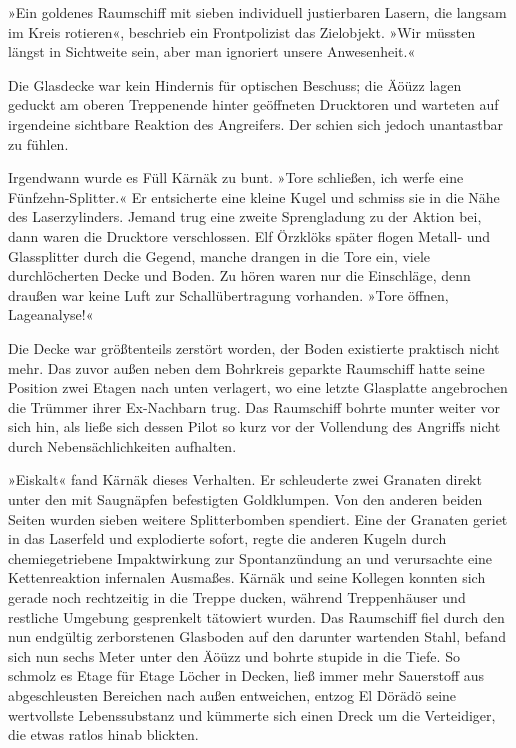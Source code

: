 »Ein goldenes Raumschiff mit sieben individuell justierbaren Lasern, die langsam im Kreis rotieren«, beschrieb ein Frontpolizist das Zielobjekt. »Wir müssten längst in Sichtweite sein, aber man ignoriert unsere Anwesenheit.«

Die Glasdecke war kein Hindernis für optischen Beschuss; die Äöüzz lagen geduckt am oberen Treppenende hinter geöffneten Drucktoren und warteten auf irgendeine sichtbare Reaktion des Angreifers. Der schien sich jedoch unantastbar zu fühlen.

Irgendwann wurde es Füll Kärnäk zu bunt. »Tore schließen, ich werfe eine Fünfzehn-Splitter.« Er entsicherte eine kleine Kugel und schmiss sie in die Nähe des Laserzylinders. Jemand trug eine zweite Sprengladung zu der Aktion bei, dann waren die Drucktore verschlossen. Elf Örzklöks später flogen Metall- und Glassplitter durch die Gegend, manche drangen in die Tore ein, viele durchlöcherten Decke und Boden. Zu hören waren nur die Einschläge, denn draußen war keine Luft zur Schallübertragung vorhanden. »Tore öffnen, Lageanalyse!«

Die Decke war größtenteils zerstört worden, der Boden existierte praktisch nicht mehr. Das zuvor außen neben dem Bohrkreis geparkte Raumschiff hatte seine Position zwei Etagen nach unten verlagert, wo eine letzte Glasplatte angebrochen die Trümmer ihrer Ex-Nachbarn trug. Das Raumschiff bohrte munter weiter vor sich hin, als ließe sich dessen Pilot so kurz vor der Vollendung des Angriffs nicht durch Nebensächlichkeiten aufhalten.

»Eiskalt« fand Kärnäk dieses Verhalten. Er schleuderte zwei Granaten direkt unter den mit Saugnäpfen befestigten Goldklumpen. Von den anderen beiden Seiten wurden sieben weitere Splitterbomben spendiert. Eine der Granaten geriet in das Laserfeld und explodierte sofort, regte die anderen Kugeln durch chemiegetriebene Impaktwirkung zur Spontanzündung an und verursachte eine Kettenreaktion infernalen Ausmaßes. Kärnäk und seine Kollegen konnten sich gerade noch rechtzeitig in die Treppe ducken, während Treppenhäuser und restliche Umgebung gesprenkelt tätowiert wurden. Das Raumschiff fiel durch den nun endgültig zerborstenen Glasboden auf den darunter wartenden Stahl, befand sich nun sechs Meter unter den Äöüzz und bohrte stupide in die Tiefe. So schmolz es Etage für Etage Löcher in Decken, ließ immer mehr Sauerstoff aus abgeschleusten Bereichen nach außen entweichen, entzog El Dörädö seine wertvollste Lebenssubstanz und kümmerte sich einen Dreck um die Verteidiger, die etwas ratlos hinab blickten.


